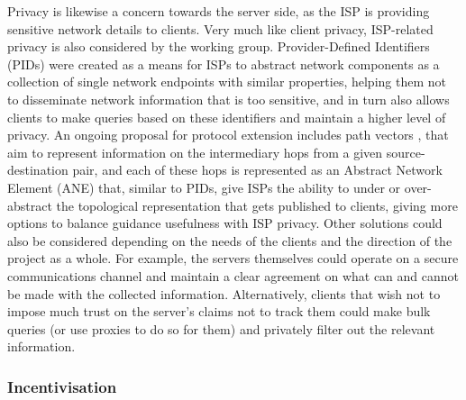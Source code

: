     Privacy is likewise a concern towards the server side, as the ISP is providing sensitive network details to clients.
    Very much like client privacy, ISP-related privacy is also considered by the working group.
    Provider-Defined Identifiers (PIDs) were created as a means for ISPs to abstract network components as a collection of single network endpoints with similar properties, helping them not to disseminate network information that is too sensitive, and in turn also allows clients to make queries based on these identifiers and maintain a higher level of privacy.
    An ongoing proposal for protocol extension includes path vectors \cite{alto-path-vector(draft)}, that aim to represent information on the intermediary hops from a given source-destination pair, and each of these hops is represented as an Abstract Network Element (ANE) that, similar to PIDs, give ISPs the ability to under or over-abstract the topological representation that gets published to clients, giving more options to balance guidance usefulness with ISP privacy.
    Other solutions could also be considered depending on the needs of the clients and the direction of the project as a whole.
    For example, the servers themselves could operate on a secure communications channel and maintain a clear agreement on what can and cannot be made with the collected information.
    Alternatively, clients that wish not to impose much trust on the server's claims not to track them could make bulk queries (or use proxies to do so for them) and privately filter out the relevant information.

\subsubsection{Incentivisation}

